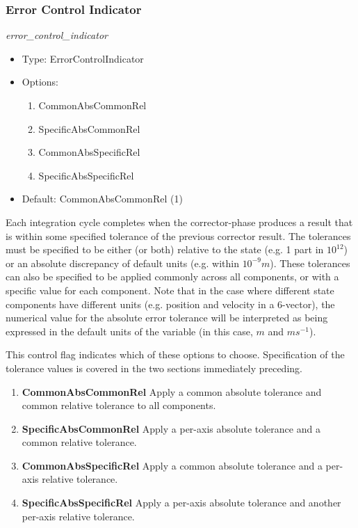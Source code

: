 \subsubsection{Error Control Indicator} \textit{error\_control\_indicator}
\begin{itemize}
\item Type: ErrorControlIndicator
\item Options:
 \begin{enumerate}
 \item CommonAbsCommonRel
 \item SpecificAbsCommonRel
 \item CommonAbsSpecificRel
 \item SpecificAbsSpecificRel
 \end{enumerate}
\item Default:  CommonAbsCommonRel   (1)
\end{itemize}

Each integration cycle completes when the corrector-phase produces a result
that is within some specified tolerance of the previous corrector result.
 The tolerances must be specified to be either (or both) relative to the
state (e.g. 1 part in $10^{12}$) or an absolute discrepancy of default units
(e.g. within  $10^{-9} m$).  These tolerances can also be specified to be
applied
commonly across all components, or with a specific value for each component.
Note that in the case where different state components have different units
(e.g. position and velocity in a 6-vector), the numerical value for the
absolute error tolerance will be interpreted as being expressed in the
default units of the variable (in this case, $m$ and $m s^{-1}$).

This control flag indicates which of these options to choose.
Specification of the tolerance values is covered in the two sections
immediately preceding.
\begin{enumerate}
\item \textbf{CommonAbsCommonRel} \newline
Apply a common absolute tolerance and common
relative tolerance to all components.
\item \textbf{SpecificAbsCommonRel}  \newline
Apply a per-axis absolute tolerance and a
common
relative tolerance.
\item \textbf{CommonAbsSpecificRel}  \newline
Apply a common absolute tolerance and a
per-axis relative tolerance.
\item \textbf{SpecificAbsSpecificRel} \newline
Apply a per-axis absolute tolerance and
another per-axis relative tolerance.
\end{enumerate}



